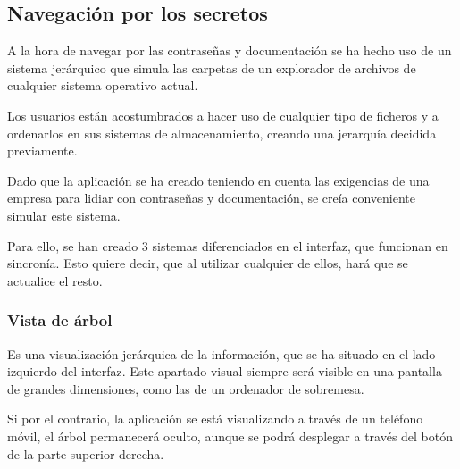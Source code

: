 \documentclass{\ClassPath/viu-tfm-template}
\begin{document}
\subsection{Navegación por los secretos}

A la hora de navegar por las contraseñas y documentación se ha hecho uso de un sistema jerárquico que simula las carpetas de un explorador de archivos de cualquier sistema operativo actual.

Los usuarios están acostumbrados a hacer uso de cualquier tipo de ficheros y a ordenarlos en sus sistemas de almacenamiento, creando una jerarquía decidida previamente.

Dado que la aplicación se ha creado teniendo en cuenta las exigencias de una empresa para lidiar con contraseñas y documentación, se creía conveniente simular este sistema.

Para ello, se han creado 3 sistemas diferenciados en el interfaz, que funcionan en sincronía. Esto quiere decir, que al utilizar cualquier de ellos, hará que se actualice el resto.

\subsubsection*{Vista de árbol}
Es una visualización jerárquica de la información, que se ha situado en el lado izquierdo del interfaz. Este apartado visual siempre será visible en una pantalla de grandes dimensiones, como las de un ordenador de sobremesa.

Si por el contrario, la aplicación se está visualizando a través de un teléfono móvil, el árbol permanecerá oculto, aunque se podrá desplegar a través del botón de la parte superior derecha.
\end{document}
